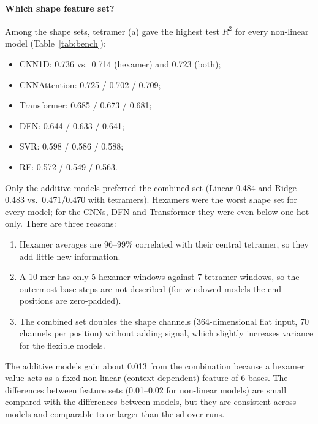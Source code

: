 \documentclass[11pt,a4paper]{article}
\begin{document}
\paragraph{Which shape feature set?} Among the shape sets, tetramer (a) gave the highest test $R^2$ for every non-linear model (Table~\ref{tab:bench}):
\begin{itemize}
\item CNN1D: 0.736 vs.\ 0.714 (hexamer) and 0.723 (both);
\item CNNAttention: 0.725 / 0.702 / 0.709;
\item Transformer: 0.685 / 0.673 / 0.681;
\item DFN: 0.644 / 0.633 / 0.641;
\item SVR: 0.598 / 0.586 / 0.588;
\item RF: 0.572 / 0.549 / 0.563.
\end{itemize}
Only the additive models preferred the combined set (Linear 0.484 and Ridge 0.483 vs.\ 0.471/0.470 with tetramers). Hexamers were the worst shape set for every model; for the CNNs, DFN and Transformer they were even below one-hot only. There are three reasons:
\begin{enumerate}
\item Hexamer averages are 96--99\% correlated with their central tetramer, so they add little new information.
\item A 10-mer has only 5 hexamer windows against 7 tetramer windows, so the outermost base steps are not described (for windowed models the end positions are zero-padded).
\item The combined set doubles the shape channels (364-dimensional flat input, 70 channels per position) without adding signal, which slightly increases variance for the flexible models.
\end{enumerate}
The additive models gain about 0.013 from the combination because a hexamer value acts as a fixed non-linear (context-dependent) feature of 6 bases. The differences between feature sets (0.01--0.02 for non-linear models) are small compared with the differences between models, but they are consistent across models and comparable to or larger than the sd over runs.
\end{document}
